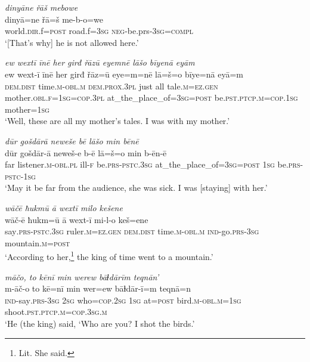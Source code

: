\ea \label{ŠJ.108}
\textit{dinyāne řāš mebowe} \\ 
\gll dinyā=ne řā=š me-b-o=we \\ 
 world\textsc{.dir}.f\textsc{=\textsc{post}} road.f\textsc{=3sg} \textsc{neg-}be.prs\textsc{-3sg}\textsc{=compl} \\ 
\glt `[That’s why] he is not allowed here.'
\z 
 
\ea \label{KŠ.1}
\textit{ew wextī īnē her girđ řāzū eyemnē lāšo bīyenā eyām} \\ 
\gll ew wext-ī īnē her girđ řāz=ū eye=m=nē lā=š=o bīye=nā eyā=m \\ 
 \textsc{dem.dist} time\textsc{.m}\textsc{-obl}\textsc{.m} \textsc{dem.prox}\textsc{.3pl} just all tale\textsc{.m}\textsc{=ez.gen} mother\textsc{.obl}\textsc{.f}\textsc{=\textsc{1sg}}\textsc{=cop}\textsc{.3pl} at\_the\_place\_of\textsc{=3sg}\textsc{=\textsc{post}} be\textsc{.pst}\textsc{.ptcp}\textsc{.m}\textsc{=cop}\textsc{.\textsc{1sg}} mother\textsc{=\textsc{1sg}} \\ 
\glt `Well, these are all my mother’s tales. I was with my mother.'
\z 
 
\ea \label{KŠ.2}
\textit{dūr gošdārā neweše bē lāšo min bēnē} \\ 
\gll dūr gošdār-ā neweš-e b-ē lā=š=o min b-ēn-ē \\ 
 far listener\textsc{.m}\textsc{-obl}\textsc{.pl} ill\textsc{-f} be\textsc{.prs}\textsc{-pstc}\textsc{.3sg} at\_the\_place\_of\textsc{=3sg}\textsc{=\textsc{post}} \textsc{1sg} be\textsc{.prs}\textsc{-pstc}\textsc{-\textsc{1sg}} \\ 
\glt `May it be far from the audience, she was sick. I was [staying] with her.'
\z 
 
\ea \label{KŠ.3}
\textit{wāčē ħukmū ā wextī milo kešene} \\ 
\gll wāč-ē ħukm=ū ā wext-ī mi-l-o keš=ene \\ 
 say\textsc{.prs}\textsc{-pstc}\textsc{.3sg} ruler\textsc{.m}\textsc{=ez.gen} \textsc{dem.dist} time\textsc{.m}\textsc{-obl}\textsc{.m} \textsc{ind-}go\textsc{.prs}\textsc{-3sg} mountain\textsc{.m}\textsc{=\textsc{post}} \\ 
\glt `According to her,\footnote{Lit. She said.} the king of time went to a mountain.'
\z 
 
\ea \label{KŠ.10}
\textit{māčo, to kēnī min werew bāɫdārīm teqnān’} \\ 
\gll m-āč-o to kē=nī min wer=ew bāɫdār-ī=m teqnā=n \\ 
 \textsc{ind-}say\textsc{.prs}\textsc{-3sg} \textsc{2sg} who\textsc{=cop}\textsc{.\textsc{2sg}} \textsc{1sg} at\textsc{=\textsc{post}} bird\textsc{.m}\textsc{-obl}\textsc{.m}\textsc{=\textsc{1sg}} shoot\textsc{.pst}\textsc{.ptcp}\textsc{.m}\textsc{=cop}\textsc{.3sg}\textsc{.m} \\ 
\glt `He (the king) said, ‘Who are you? I shot the birds.'
\z 
 
